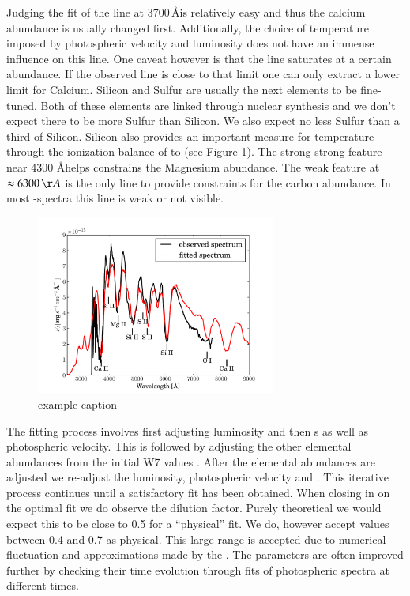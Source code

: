 Judging the fit of the  line at 3700\,\AA is relatively easy and thus the calcium abundance is usually changed first. Additionally, the choice of temperature imposed by photospheric velocity and luminosity does not have an immense influence on this line. One caveat however is that the  line saturates at a certain abundance. If the observed  line is close to that limit one can only extract a lower limit for Calcium.
Silicon and Sulfur are usually the next elements to be fine-tuned. Both of these elements are linked through nuclear synthesis and we don't expect there to be more Sulfur than Silicon. We also expect no less Sulfur than a third of Silicon. Silicon also provides an important measure for temperature through the ionization balance of  to  (see Figure \ref{fig:sn2002bo_lineident}). The strong strong  feature near 4300 \AA helps constrains the Magnesium abundance. The weak  feature at $\approx 6300\,\AA$ is the only line to provide constraints for the carbon abundance. In most \sneia-spectra this line is weak or not visible.
\begin{figure}[htbp] %
   \centering
   \includegraphics[width=0.7\textwidth]{chapter_dalek/plots/bf2002bo-10_lineid.pdf} 
   \caption{example caption}
   \label{fig:sn2002bo_lineident}
\end{figure}

The fitting process involves first adjusting luminosity and then \ige s as well as photospheric velocity. This is followed by adjusting the other elemental abundances from the initial W7 values \citep{1984ApJ...286..644N}. After the elemental abundances are adjusted we re-adjust the luminosity, photospheric velocity and \ige. This iterative process continues until a satisfactory fit has been obtained. When closing in on the optimal fit we do observe the dilution factor. Purely theoretical we would expect this to be close to 0.5 for a ``physical'' fit. We do, however accept values between 0.4 and 0.7 as physical. This large range is accepted due to numerical fluctuation and approximations made by the \mlc. The parameters are often improved further by checking their time evolution through fits of photospheric spectra at different times.


